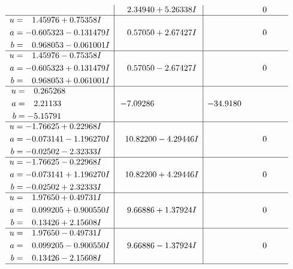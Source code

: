 \documentclass[1p]{elsarticle_modified}
\theoremstyle{definition}
\begin{document}
$$\begin{array}{c|c|c}
 & \phantom{-}2.34940 + 5.26338 I & \phantom{-0.000000 } 0 \\ \hline\begin{aligned}
u &= \phantom{-}1.45976 + 0.75358 I \\
a &= -0.605323 - 0.131479 I \\
b &= \phantom{-}0.968053 - 0.061001 I\end{aligned}
 & \phantom{-}0.57050 + 2.67427 I & \phantom{-0.000000 } 0 \\ \hline\begin{aligned}
u &= \phantom{-}1.45976 - 0.75358 I \\
a &= -0.605323 + 0.131479 I \\
b &= \phantom{-}0.968053 + 0.061001 I\end{aligned}
 & \phantom{-}0.57050 - 2.67427 I & \phantom{-0.000000 } 0 \\ \hline\begin{aligned}
u &= \phantom{-}0.265268\phantom{ +0.000000I} \\
a &= \phantom{-}2.21133\phantom{ +0.000000I} \\
b &= -5.15791\phantom{ +0.000000I}\end{aligned}
 & -7.09286\phantom{ +0.000000I} & -34.9180\phantom{ +0.000000I} \\ \hline\begin{aligned}
u &= -1.76625 + 0.22968 I \\
a &= -0.073141 - 1.196270 I \\
b &= -0.02502 - 2.32333 I\end{aligned}
 & \phantom{-}10.82200 - 4.29446 I & \phantom{-0.000000 } 0 \\ \hline\begin{aligned}
u &= -1.76625 - 0.22968 I \\
a &= -0.073141 + 1.196270 I \\
b &= -0.02502 + 2.32333 I\end{aligned}
 & \phantom{-}10.82200 + 4.29446 I & \phantom{-0.000000 } 0 \\ \hline\begin{aligned}
u &= \phantom{-}1.97650 + 0.49731 I \\
a &= \phantom{-}0.099205 + 0.900550 I \\
b &= \phantom{-}0.13426 + 2.15608 I\end{aligned}
 & \phantom{-}9.66886 + 1.37924 I & \phantom{-0.000000 } 0 \\ \hline\begin{aligned}
u &= \phantom{-}1.97650 - 0.49731 I \\
a &= \phantom{-}0.099205 - 0.900550 I \\
b &= \phantom{-}0.13426 - 2.15608 I\end{aligned}
 & \phantom{-}9.66886 - 1.37924 I & \phantom{-0.000000 } 0\\
 \hline 
 \end{array}$$\newpage\newpage\renewcommand{\arraystretch}{1}
\end{document}
